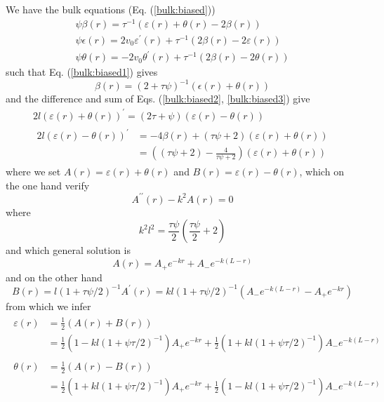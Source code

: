 \documentclass[pre,aps,superscriptaddress,nofootinbib]{revtex4}
\begin{document}
We have the bulk equations (Eq. (\ref{bulk:biased}))
\begin{eqnarray}
\label{bulk:biased1}
\psi \beta(r) = \tau^{-1} (\varepsilon(r) + \theta(r) - 2 \beta(r))\\
\label{bulk:biased2}
\psi \epsilon(r) = 2 v_0 \varepsilon^{\prime}(r) + \tau^{-1} (2 \beta(r) - 2 \varepsilon(r))\\
\label{bulk:biased3}
\psi \theta(r) = -2 v_0 \theta^{\prime}(r) + \tau^{-1} (2 \beta(r) - 2 \theta(r))
\end{eqnarray}
such that Eq. (\ref{bulk:biased1}) gives
\begin{equation}
\beta(r) = (2 + \tau\psi)^{-1} (\epsilon(r) + \theta(r))
\end{equation}
and the difference and sum of Eqs. (\ref{bulk:biased2}, \ref{bulk:biased3}) give
\begin{eqnarray}
2 l (\varepsilon(r) + \theta(r))^{\prime} = (2 \tau + \psi)(\varepsilon(r) - \theta(r))\\
\begin{aligned}
2 l (\varepsilon(r) - \theta(r))^{\prime} &= -4 \beta(r) + (\tau\psi + 2)(\varepsilon(r) + \theta(r))\\
&= \left((\tau\psi + 2) - \frac{4}{\tau\psi + 2}\right)(\varepsilon(r) + \theta(r))
\end{aligned}
\end{eqnarray}
where we set $A(r) = \varepsilon(r) + \theta(r)$ and $B(r) = \varepsilon(r) - \theta(r)$, which on the one hand verify
\begin{equation}
A^{\prime\prime}(r) - k^2 A(r) = 0
\end{equation}
where
\begin{equation}
k^2 l^2 = \frac{\tau \psi}{2}\left(\frac{\tau \psi}{2} + 2\right)
\label{kPsi}
\end{equation}
and which general solution is
\begin{equation}
A(r) = A_+ e^{- k r} + A_- e^{-k (L - r)}
\end{equation}
and on the other hand
\begin{equation}
B(r) = l(1 + \tau \psi/2)^{-1} A^{\prime}(r) = kl (1 + \tau\psi/2)^{-1} (A_- e^{-k(L - r)} - A_+ e^{-k r})
\end{equation}
from which we infer
\begin{eqnarray}
\begin{aligned}
\varepsilon(r) &= \frac{1}{2} (A(r) + B(r))\\
&= \frac{1}{2}\left(1 - k l (1 + \psi \tau/2)^{-1}\right) A_+ e^{- k r} + \frac{1}{2}\left(1 + k l (1 + \psi \tau/2)^{-1}\right) A_- e^{- k (L - r)}
\end{aligned}
\mbox{}\\
\begin{aligned}
\theta(r) &= \frac{1}{2} (A(r) - B(r))\\
&= \frac{1}{2}\left(1 + k l (1 + \psi \tau/2)^{-1}\right) A_+ e^{- k r} + \frac{1}{2}\left(1 - k l (1 + \psi \tau/2)^{-1}\right) A_- e^{- k (L - r)}
\end{aligned}
\end{eqnarray}
\end{document}
